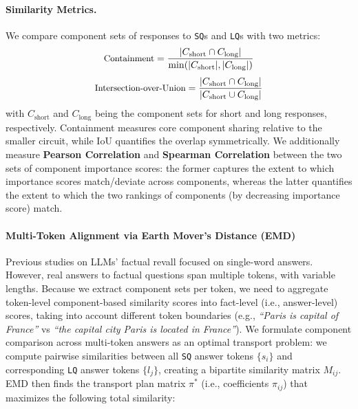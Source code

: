 \documentclass[11pt]{article}
\begin{document}
\paragraph{Similarity Metrics.}
We compare component sets of responses to \texttt{SQ}s and \texttt{LQ}s with two metrics:
%
\begin{equation}
    \small
    \text{Containment} = \frac{|C_{\text{short}} \cap C_{\text{long}}|}{\min(|C_{\text{short}}|, |C_{\text{long}}|)}\\
\end{equation}
%
\begin{equation}
    \small
    \text{Intersection-over-Union} = \frac{|C_{\text{short}} \cap C_{\text{long}}|}{|C_{\text{short}} \cup C_{\text{long}}|}
\end{equation}
%
\noindent with $C_{\text{short}}$ and $C_{\text{long}}$ being the component sets for short and long responses, respectively. Containment measures core component sharing relative to the smaller circuit, while IoU quantifies the overlap symmetrically. We additionally measure \textbf{Pearson Correlation} and \textbf{Spearman Correlation} between the two sets of component importance scores: the former captures the extent to which importance scores match/deviate across components, whereas the latter quantifies the extent to which the two rankings of components (by decreasing importance score) match.


\paragraph{Multi-Token Alignment via Earth Mover's Distance (EMD)}

Previous studies on LLMs' factual revall \cite{meng2022locating, geva-etal-2023-dissecting, yao2024knowledge} focused on single-word answers. However, real answers to factual questions span multiple tokens, with variable lengths. Because we extract component sets per token, we need to aggregate token-level component-based similarity scores into fact-level (i.e., answer-level) scores, taking into account different token boundaries (e.g., \textit{``Paris is capital of France''} vs \textit{``the capital city Paris is located in France''}).
%
We formulate component comparison across multi-token answers as an optimal transport problem: we compute pairwise similarities between all \texttt{SQ} answer tokens $\{s_i\}$ and corresponding \texttt{LQ} answer tokens $\{l_j\}$, creating a bipartite similarity matrix $M_{ij}$. EMD then finds the transport plan matrix $\pi^*$ (i.e., coefficients $\pi_{ij}$) that maximizes the following total similarity:
\end{document}
